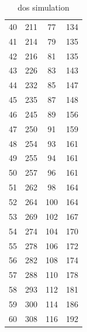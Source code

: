\begin{table}[h]
\begin{tabular}{|c|c|c|c|}
40 & 211 & 77 & 134 \\
41 & 214 & 79 & 135 \\
42 & 216 & 81 & 135 \\
43 & 226 & 83 & 143 \\
44 & 232 & 85 & 147 \\
45 & 235 & 87 & 148 \\
46 & 245 & 89 & 156 \\
47 & 250 & 91 & 159 \\
48 & 254 & 93 & 161 \\
49 & 255 & 94 & 161 \\
50 & 257 & 96 & 161 \\
51 & 262 & 98 & 164 \\
52 & 264 & 100 & 164 \\
53 & 269 & 102 & 167 \\
54 & 274 & 104 & 170 \\
55 & 278 & 106 & 172 \\
56 & 282 & 108 & 174 \\
57 & 288 & 110 & 178 \\
58 & 293 & 112 & 181 \\
59 & 300 & 114 & 186 \\
60 & 308 & 116 & 192 \\
\hline
\end{tabular}
\caption{dos simulation}
\label{tab:T09}
\end{table}

